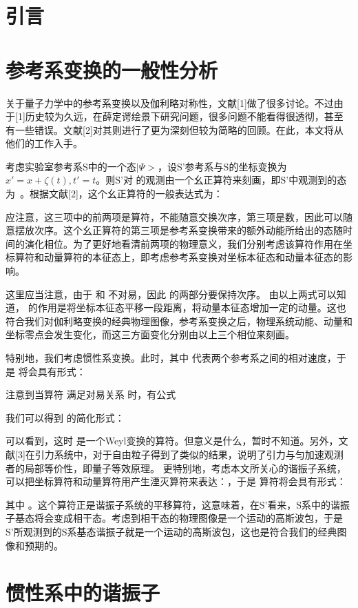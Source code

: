 \documentclass{article}
\begin{document}
    \section{引言}

    \section{参考系变换的一般性分析}
    关于量子力学中的参考系变换以及伽利略对称性，文献[1]做了很多讨论。不过由于[1]历史较为久远，在薛定谔绘景下研究问题，很多问题不能看得很透彻，甚至有一些错误。文献[2]对其则进行了更为深刻但较为简略的回顾。在此，本文将从他们的工作入手。
    
    考虑实验室参考系S中的一个态$|\Psi>$，设S’参考系与S的坐标变换为$x'=x+\zeta(t), t'=t$。则S’对 的观测由一个幺正算符来刻画，即S’中观测到的态为 。根据文献[2]，这个幺正算符的一般表达式为：
    
    应注意，这三项中的前两项是算符，不能随意交换次序，第三项是数，因此可以随意摆放次序。这个幺正算符的第三项是参考系变换带来的额外动能所给出的态随时间的演化相位。为了更好地看清前两项的物理意义，我们分别考虑该算符作用在坐标算符和动量算符的本征态上，即考虑参考系变换对坐标本征态和动量本征态的影响。
    
    
    这里应当注意，由于 和 不对易，因此 的两部分要保持次序。
    由以上两式可以知道， 的作用是将坐标本征态平移一段距离，将动量本征态增加一定的动量。这也符合我们对伽利略变换的经典物理图像，参考系变换之后，物理系统动能、动量和坐标零点会发生变化，而这三方面变化分别由以上三个相位来刻画。
    
    特别地，我们考虑惯性系变换。此时，其中 代表两个参考系之间的相对速度，于是 将会具有形式：
    
    注意到当算符 满足对易关系 时，有公式
    
    我们可以得到 的简化形式：
    
    可以看到，这时 是一个Weyl变换的算符。但意义是什么，暂时不知道。另外，文献[3]在引力系统中，对于自由粒子得到了类似的结果，说明了引力与匀加速观测者的局部等价性，即量子等效原理。
    更特别地，考虑本文所关心的谐振子系统，可以把坐标算符和动量算符用产生湮灭算符来表达：，于是 算符将会具有形式：
    
    其中 。这个算符正是谐振子系统的平移算符，这意味着，在S’看来，S系中的谐振子基态将会变成相干态。考虑到相干态的物理图像是一个运动的高斯波包，于是S’所观测到的S系基态谐振子就是一个运动的高斯波包，这也是符合我们的经典图像和预期的。
    
    \section{惯性系中的谐振子}
\end{document}

